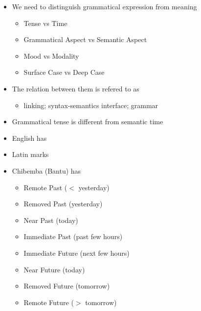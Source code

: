 \documentclass[a4paper,landscape,headrule,footrule,xetex]{foils}
\begin{document}
\begin{itemize}
\item  We need to distinguish grammatical expression from 
  meaning
  \begin{itemize}
  \item  Tense vs Time
  \item  Grammatical Aspect vs Semantic Aspect
  \item  Mood vs Modality
  \item  Surface Case vs Deep Case
  \end{itemize}
\item  The relation between them is refered to as
  \begin{itemize}
  \item  linking; syntax-semantics interface; grammar
  \end{itemize}
\end{itemize} 
 

\begin{itemize}
\item  Grammatical tense is different from semantic time
\item  English has 
\item  Latin marks 
\item  Chibemba (Bantu) has 
  \begin{multicols}{2}
  \begin{itemize}
  \item  Remote Past ($<$ yesterday)
  \item  Removed Past (yesterday)
  \item  Near Past (today)
  \item  Immediate Past (past few hours)
  \item Immediate Future (next few hours)
  \item Near Future (today)
  \item Removed Future (tomorrow)
  \item Remote Future ($>$ tomorrow)
  \end{itemize}
\end{multicols}
\end{itemize}
\end{document}
